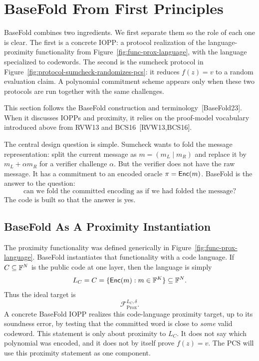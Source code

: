 \section{BaseFold From First Principles}

BaseFold combines two ingredients.  We first separate them so the role of each
one is clear.  The first is a concrete IOPP: a protocol realization of the
language-proximity functionality from Figure~\ref{fig:func-prox-language}, with
the language specialized to codewords.  The second is the sumcheck protocol in
Figure~\ref{fig:protocol-sumcheck-randomizes-pcs}: it reduces $f(z)=v$ to a
random evaluation claim.  A polynomial commitment scheme appears only when
these two protocols are run together with the same challenges.

This section follows the BaseFold construction and terminology~[BaseFold23].
When it discusses IOPPs and proximity, it relies on the proof-model vocabulary
introduced above from RVW13 and BCS16~[RVW13,BCS16].

The central design question is simple.  Sumcheck wants to fold the message
representation: split the current message as $m=(m_L\mid m_R)$ and replace it
by $m_L+\alpha m_R$ for a verifier challenge $\alpha$.  But the verifier does
not have the raw message.  It has a commitment to an encoded oracle
$\pi=\mathsf{Enc}(m)$.  BaseFold is the answer to the question:
\[
  \text{can we fold the committed encoding as if we had folded the message?}
\]
The code is built so that the answer is yes.

\subsection{BaseFold As A Proximity Instantiation}

The proximity functionality was defined generically in
Figure~\ref{fig:func-prox-language}.  BaseFold instantiates that functionality
with a code language.  If \(C\subseteq\mathbb{F}^N\) is the public code at one layer,
then the language is simply
\[
  L_C=C=\{\mathsf{Enc}(m):m\in\mathbb{F}^K\}\subseteq\mathbb{F}^N.
\]
Thus the ideal target is
\[
  \mathcal F_{\mathrm{Prox}}^{L_C,\delta}.
\]
A concrete BaseFold IOPP realizes this code-language proximity target, up to
its soundness error, by testing that the committed word is close to
\emph{some} valid codeword.  This statement is only about proximity to
\(L_C\).  It does not say which polynomial was encoded, and it does not by
itself prove \(f(z)=v\).  The PCS will use this proximity statement as one
component.

